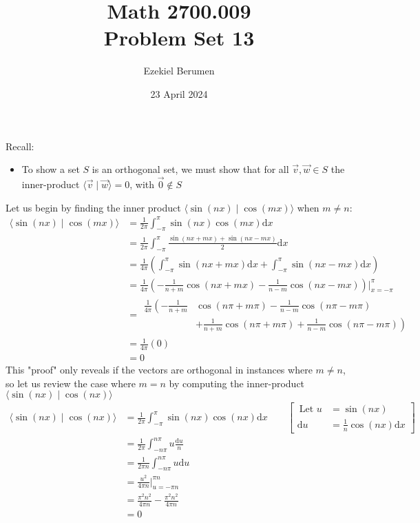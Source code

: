 \documentclass{report}
\title{\Huge{Math 2700.009}\\Problem Set 13}
\author{\huge{Ezekiel Berumen}}
\date{23 April 2024}
\begin{document}
\maketitle
\newpage

\begin{note}
Recall:
\begin{itemize}
\item To show a set $S$ is an orthogonal set, we must show that for all $\vec{v},\vec{w}\in S$ the inner-product $\langle \vec{v} \mid \vec{w} \rangle=0$, with $\vec{0}\notin S$
\end{itemize}
\end{note}
\sol Let us begin by finding the inner product $\langle \sin(nx) \mid \cos(mx) \rangle$ when $m \neq n$:
$$
\begin{aligned}
\langle \sin(nx) \mid \cos(mx) \rangle &= \frac{1}{2\pi} \int_{-\pi}^{\pi} \sin(nx)\cos(mx)\mathrm{d}x \\
&= \frac{1}{2\pi} \int_{-\pi}^{\pi} \frac{\sin(nx + mx)+\sin(nx-mx)}{2}\mathrm{d}x\\
&=\frac{1}{4\pi} \left(\int_{-\pi}^{\pi}\sin(nx+mx)\mathrm{d}x + \int_{-\pi}^{\pi}\sin(nx-mx)\mathrm{d}x\right)\\
&=\frac{1}{4\pi} \left(-\frac{1}{n+m}\cos(nx+mx)-\frac{1}{n-m}\cos(nx-mx)\right)\biggr\rvert_{x=-\pi}^\pi\\
&=\begin{aligned}
\frac{1}{4\pi} \left(-\frac{1}{n+m}\right.&\cos(n\pi+m\pi)-\frac{1}{n-m}\cos(n\pi-m\pi) \\
&+\left.\frac{1}{n+m}\cos(n\pi+m\pi)+\frac{1}{n-m}\cos(n\pi-m\pi)\right)
\end{aligned}\\
&=\frac{1}{4\pi}(0)\\
&=0
\end{aligned}
$$
This "proof" only reveals if the vectors are orthogonal in instances where $m\neq n$, so let us review the case where $m = n$ by computing the inner-product $\langle \sin(nx) \mid \cos(nx) \rangle$
$$
\begin{aligned}
\langle \sin(nx) \mid \cos(nx) \rangle &= \frac{1}{2\pi} \int_{-\pi}^{\pi} \sin(nx)\cos(nx)\mathrm{d}x \qquad \left[\begin{aligned}\
\text{Let } u &= \sin(nx)\\
\mathrm{d}u &= \frac{1}{n}\cos(nx)\mathrm{d}x
\end{aligned}\right]\\
&=\frac{1}{2\pi} \int_{-n\pi}^{n\pi} u \frac{\mathrm{d}u}{n} \\
&=\frac{1}{2\pi n} \int_{-n\pi}^{n\pi} u \mathrm{d}u\\
&=\frac{u^2}{4\pi n}\biggr\rvert_{u=-\pi n}^{\pi n}\\
&=\frac{\pi^2 n^2}{4\pi n} - \frac{\pi^2 n^2}{4\pi n}\\
&=0
\end{aligned}
$$
\end{document}
